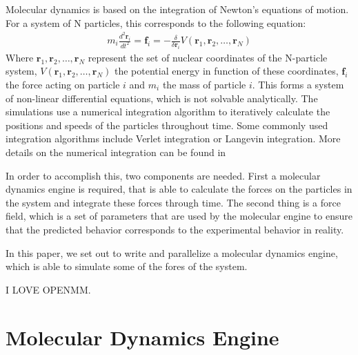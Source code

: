 \documentclass[conference]{IEEEtran}
\begin{document}
Molecular dynamics is based on the integration of Newton's equations of motion. For a system of N particles, this
 corresponds to the following equation:
\begin{align}
    m_i \frac{d^2\mathbf{r}_i}{dt^2} = \mathbf{f}_i = -\frac{\delta}{\delta \mathbf{r}_i}V(\mathbf{r}_1,\mathbf{r}_2,\ldots,\mathbf{r}_N)
\end{align}
Where $\mathbf{r}_1,\mathbf{r}_2,\ldots,\mathbf{r}_N$ represent the set of nuclear coordinates of the N-particle system, 
$V(\mathbf{r}_1,\mathbf{r}_2,\ldots,\mathbf{r}_N)$ the potential energy in function of these coordinates, $\mathbf{f}_i$
the force acting on particle $i$ and $m_i$ the mass of particle $i$. This forms a system of non-linear differential 
equations, which is not solvable analytically. The simulations use a numerical integration algorithm to iteratively
calculate the positions and speeds of the particles throughout time. Some commonly used integration algorithms
include Verlet integration or Langevin integration. More details on the numerical integration can be found in 


In order to accomplish this, two components are needed. First a
molecular dynamics engine is required, that is able to calculate the forces on the particles in the system and
integrate these forces through time. The second thing is a force field, which is a set of parameters that are
used by the molecular engine to ensure that the predicted behavior corresponds to the experimental behavior in reality.

In this paper, we set out to write and parallelize a molecular dynamics engine, which is able to simulate some of the
fores of the system.

I LOVE OPENMM.\cite{eastman2010openmm}

\section{Molecular Dynamics Engine}
\end{document}
